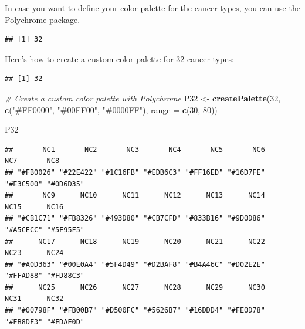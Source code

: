 \documentclass[
]{book}
\newenvironment{Shaded}{\begin{snugshade}}{\end{snugshade}}
\newcommand{\AttributeTok}[1]{\textcolor[rgb]{0.13,0.29,0.53}{#1}}
\newcommand{\CommentTok}[1]{\textcolor[rgb]{0.56,0.35,0.01}{\textit{#1}}}
\newcommand{\DecValTok}[1]{\textcolor[rgb]{0.00,0.00,0.81}{#1}}
\newcommand{\FunctionTok}[1]{\textcolor[rgb]{0.13,0.29,0.53}{\textbf{#1}}}
\newcommand{\NormalTok}[1]{#1}
\newcommand{\OtherTok}[1]{\textcolor[rgb]{0.56,0.35,0.01}{#1}}
\newcommand{\SpecialCharTok}[1]{\textcolor[rgb]{0.81,0.36,0.00}{\textbf{#1}}}
\newcommand{\StringTok}[1]{\textcolor[rgb]{0.31,0.60,0.02}{#1}}
\begin{document}
In case you want to define your color palette for the cancer types, you can use the Polychrome package.

\begin{Shaded}
\end{Shaded}

\begin{verbatim}
## [1] 32
\end{verbatim}

Here's how to create a custom color palette for 32 cancer types:

\begin{Shaded}
\end{Shaded}

\begin{verbatim}
## [1] 32
\end{verbatim}

\begin{Shaded}
\begin{Highlighting}[]
\CommentTok{\# Create a custom color palette with Polychrome}
\NormalTok{P32 }\OtherTok{\textless{}{-}} \FunctionTok{createPalette}\NormalTok{(}\DecValTok{32}\NormalTok{, }\FunctionTok{c}\NormalTok{(}\StringTok{"\#FF0000"}\NormalTok{, }\StringTok{"\#00FF00"}\NormalTok{, }\StringTok{"\#0000FF"}\NormalTok{), }\AttributeTok{range =} \FunctionTok{c}\NormalTok{(}\DecValTok{30}\NormalTok{, }\DecValTok{80}\NormalTok{))}

\NormalTok{P32}
\end{Highlighting}
\end{Shaded}

\begin{verbatim}
##       NC1       NC2       NC3       NC4       NC5       NC6       NC7       NC8 
## "#FB0026" "#22E422" "#1C16FB" "#EDB6C3" "#FF16ED" "#16D7FE" "#E3C500" "#0D6D35" 
##       NC9      NC10      NC11      NC12      NC13      NC14      NC15      NC16 
## "#CB1C71" "#FB8326" "#493D80" "#CB7CFD" "#833B16" "#9D0D86" "#A5CECC" "#5F95F5" 
##      NC17      NC18      NC19      NC20      NC21      NC22      NC23      NC24 
## "#A0D363" "#00E0A4" "#5F4D49" "#D2BAF8" "#B4A46C" "#D02E2E" "#FFAD88" "#FD88C3" 
##      NC25      NC26      NC27      NC28      NC29      NC30      NC31      NC32 
## "#00798F" "#FB00B7" "#D500FC" "#5626B7" "#16DDD4" "#FE0D78" "#FB8DF3" "#FDAE0D"
\end{verbatim}
\end{document}
